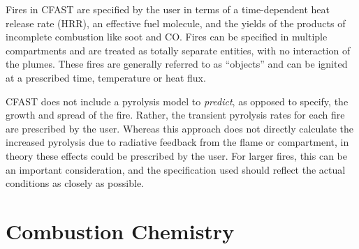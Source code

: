 \documentclass[12pt,twoside]{book}
\begin{document}
Fires in CFAST are specified by the user in terms of a time-dependent heat release rate (HRR), an effective fuel molecule, and the yields of the products of incomplete combustion like soot and CO. Fires can be specified in multiple compartments and are treated as totally separate entities, with no interaction of the plumes. These fires are generally referred to as ``objects'' and can be ignited at a prescribed time, temperature or heat flux.

CFAST does not include a pyrolysis model to {\em predict}, as opposed to specify, the growth and spread of the fire. Rather, the transient pyrolysis rates for each fire are prescribed by the user. Whereas this approach does not directly calculate the increased pyrolysis due to radiative feedback from the flame or compartment, in theory these effects could be prescribed by the user. For larger fires, this can be an important consideration, and the specification used should reflect the actual conditions as closely as possible.

\section{Combustion Chemistry}
\end{document}
